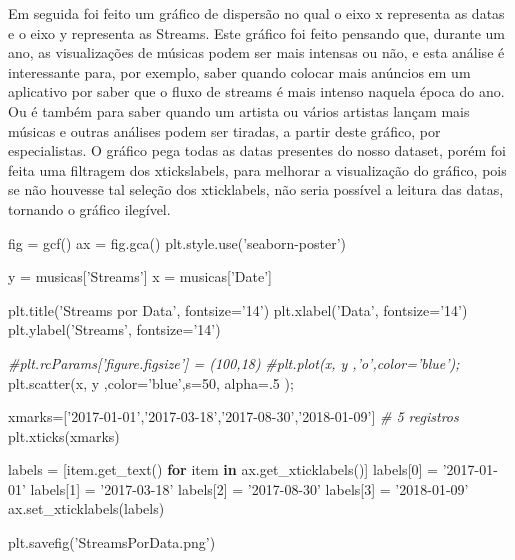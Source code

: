 \documentclass[11pt]{article}
\newenvironment{Shaded}{}{}
\newcommand{\KeywordTok}[1]{\textcolor[rgb]{0.00,0.44,0.13}{\textbf{{#1}}}}
\newcommand{\DecValTok}[1]{\textcolor[rgb]{0.25,0.63,0.44}{{#1}}}
\newcommand{\StringTok}[1]{\textcolor[rgb]{0.25,0.44,0.63}{{#1}}}
\newcommand{\CommentTok}[1]{\textcolor[rgb]{0.38,0.63,0.69}{\textit{{#1}}}}
\newcommand{\NormalTok}[1]{{#1}}
\newcommand{\ControlFlowTok}[1]{\textcolor[rgb]{0.00,0.44,0.13}{\textbf{{#1}}}}
\newcommand{\OperatorTok}[1]{\textcolor[rgb]{0.40,0.40,0.40}{{#1}}}
\begin{document}
    Em seguida foi feito um gráfico de dispersão no qual o eixo x representa
as datas e o eixo y representa as Streams. Este gráfico foi feito
pensando que, durante um ano, as visualizações de músicas podem ser mais
intensas ou não, e esta análise é interessante para, por exemplo, saber
quando colocar mais anúncios em um aplicativo por saber que o fluxo de
streams é mais intenso naquela época do ano. Ou é também para saber
quando um artista ou vários artistas lançam mais músicas e outras
análises podem ser tiradas, a partir deste gráfico, por especialistas. O
gráfico pega todas as datas presentes do nosso dataset, porém foi feita
uma filtragem dos xtickslabels, para melhorar a visualização do gráfico,
pois se não houvesse tal seleção dos xticklabels, não seria possível a
leitura das datas, tornando o gráfico ilegível.

\begin{Shaded}
\begin{Highlighting}[]
\NormalTok{fig }\OperatorTok{=}\NormalTok{ gcf()}
\NormalTok{ax }\OperatorTok{=}\NormalTok{ fig.gca()}
\NormalTok{plt.style.use(}\StringTok{'seaborn-poster'}\NormalTok{)}

\NormalTok{y }\OperatorTok{=}\NormalTok{ musicas[}\StringTok{'Streams'}\NormalTok{]}
\NormalTok{x }\OperatorTok{=}\NormalTok{ musicas[}\StringTok{'Date'}\NormalTok{] }

\NormalTok{plt.title(}\StringTok{'Streams por Data'}\NormalTok{, fontsize}\OperatorTok{=}\StringTok{'14'}\NormalTok{)}
\NormalTok{plt.xlabel(}\StringTok{'Data'}\NormalTok{, fontsize}\OperatorTok{=}\StringTok{'14'}\NormalTok{)}
\NormalTok{plt.ylabel(}\StringTok{'Streams'}\NormalTok{, fontsize}\OperatorTok{=}\StringTok{'14'}\NormalTok{)}


\CommentTok{#plt.rcParams['figure.figsize'] = (100,18)}
\CommentTok{#plt.plot(x, y ,'o',color='blue');}
\NormalTok{plt.scatter(x, y ,color}\OperatorTok{=}\StringTok{'blue'}\NormalTok{,s}\OperatorTok{=}\DecValTok{50}\NormalTok{, alpha}\OperatorTok{=}\NormalTok{.}\DecValTok{5}\NormalTok{ )}\OperatorTok{;}

\NormalTok{xmarks}\OperatorTok{=}\NormalTok{[}\StringTok{'2017-01-01'}\NormalTok{,}\StringTok{'2017-03-18'}\NormalTok{,}\StringTok{'2017-08-30'}\NormalTok{,}\StringTok{'2018-01-09'}\NormalTok{] }\CommentTok{# 5 registros}
\NormalTok{plt.xticks(xmarks)}

\NormalTok{labels }\OperatorTok{=}\NormalTok{ [item.get_text() }\ControlFlowTok{for}\NormalTok{ item }\KeywordTok{in}\NormalTok{ ax.get_xticklabels()]}
\NormalTok{labels[}\DecValTok{0}\NormalTok{] }\OperatorTok{=} \StringTok{'2017-01-01'}
\NormalTok{labels[}\DecValTok{1}\NormalTok{] }\OperatorTok{=} \StringTok{'2017-03-18'}
\NormalTok{labels[}\DecValTok{2}\NormalTok{] }\OperatorTok{=} \StringTok{'2017-08-30'}
\NormalTok{labels[}\DecValTok{3}\NormalTok{] }\OperatorTok{=} \StringTok{'2018-01-09'}
\NormalTok{ax.set_xticklabels(labels)}

\NormalTok{plt.savefig(}\StringTok{'StreamsPorData.png'}\NormalTok{) }
\end{Highlighting}
\end{Shaded}
\end{document}
